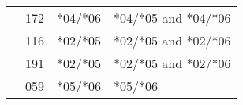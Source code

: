\documentclass[
]{article}
\begin{document}
\begin{table}[!h]
\begin{tabular}[t]{l>{}l|ll}
\hspace{1em} & 172 & *04/*06 & *04/*05 and *04/*06\\

\hspace{1em} & 116 & *02/*05 & *02/*05 and *02/*06\\

\hspace{1em} & 191 & *02/*05 & *02/*05 and *02/*06\\

\hspace{1em} & 059 & *05/*06 & *05/*06\\
\bottomrule
\end{tabular}
\end{table}
\end{document}
